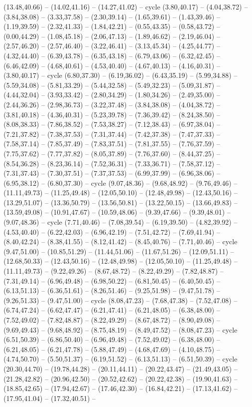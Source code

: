 {(13.48,40.66) -- (14.02,41.16) -- (14.27,41.02) -- cycle (3.80,40.17) -- (4.04,38.72) -- (3.84,38.08) -- (3.33,37.58) -- (2.30,39.14) -- (1.65,39.61) -- (1.43,39.46) -- (1.19,39.59) -- (2.32,41.33) -- (1.84,42.21) -- (0.55,43.35) -- (0.58,43.72) -- (0.00,44.29) -- (1.08,45.18) -- (2.06,47.13) -- (1.89,46.62) -- (2.19,46.04) -- (2.57,46.20) -- (2.57,46.40) -- (3.22,46.41) -- (3.13,45.34) -- (4.25,44.77) -- (4.32,44.40) -- (6.39,43.78) -- (6.35,43.18) -- (6.79,43.06) -- (6.32,42.45) -- (6.46,42.09) -- (4.68,40.61) -- (4.53,40.40) -- (4.67,40.13) -- (4.16,40.31) -- (3.80,40.17) -- cycle (6.80,37.30) -- (6.19,36.02) -- (6.43,35.19) -- (5.99,34.88) -- (5.59,34.08) -- (5.81,33.29) -- (5.44,32.58) -- (5.49,32.23) -- (5.09,31.87) -- (4.44,32.04) -- (3.93,33.42) -- (2.80,34.29) -- (1.80,34.26) -- (2.49,35.00) -- (2.44,36.26) -- (2.98,36.73) -- (3.22,37.48) -- (3.84,38.08) -- (4.04,38.72) -- (3.81,40.18) -- (4.36,40.31) -- (5.23,39.78) -- (7.36,39.42) -- (8.24,38.50) -- (8.08,38.33) -- (7.86,38.52) -- (7.53,38.27) -- (7.12,38.43) -- (6.97,38.04) -- (7.21,37.82) -- (7.38,37.53) -- (7.31,37.44) -- (7.42,37.38) -- (7.47,37.33) -- (7.58,37.14) -- (7.85,37.49) -- (7.83,37.51) -- (7.81,37.55) -- (7.76,37.59) -- (7.75,37.62) -- (7.77,37.82) -- (8.05,37.89) -- (7.76,37.60) -- (8.44,37.25) -- (8.54,36.28) -- (8.23,36.14) -- (7.52,36.31) -- (7.33,36.71) -- (7.58,37.12) -- (7.31,37.43) -- (7.30,37.51) -- (7.37,37.53) -- (6.99,37.99) -- (6.96,38.06) -- (6.95,38.12) -- (6.80,37.30) -- cycle (9.07,48.36) -- (9.68,48.92) -- (9.76,49.46) -- (11.11,49.73) -- (11.25,49.48) -- (12.05,50.10) -- (12.48,49.98) -- (12.43,50.16) -- (13.29,51.07) -- (13.36,50.79) -- (13.56,50.81) -- (13.22,50.15) -- (13.66,49.83) -- (13.59,49.08) -- (10.91,47.67) -- (10.59,48.06) -- (9.39,47.66) -- (9.39,48.01) -- (9.07,48.36) -- cycle (7.71,40.46) -- (7.08,39.54) -- (6.19,39.50) -- (4.82,39.92) -- (4.53,40.40) -- (6.22,42.03) -- (6.96,42.19) -- (7.51,42.72) -- (7.69,41.94) -- (8.40,42.24) -- (8.38,41.55) -- (8.12,41.42) -- (8.45,40.76) -- (7.71,40.46) -- cycle (9.47,51.00) -- (10.85,51.29) -- (11.44,51.06) -- (11.67,51.26) -- (12.09,51.11) -- (12.68,50.33) -- (12.43,50.16) -- (12.48,49.98) -- (12.05,50.10) -- (11.25,49.48) -- (11.11,49.73) -- (9.22,49.26) -- (8.67,48.72) -- (8.22,49.29) -- (7.82,48.87) -- (7.31,49.14) -- (6.96,49.48) -- (6.98,50.22) -- (6.81,50.45) -- (6.40,50.45) -- (6.13,51.13) -- (6.36,51.61) -- (8.26,51.46) -- (9.25,51.98) -- (9.47,51.78) -- (9.26,51.33) -- (9.47,51.00) -- cycle (8.08,47.23) -- (7.68,47.38) -- (7.52,47.08) -- (6.74,47.24) -- (6.62,47.47) -- (6.21,47.41) -- (6.21,48.05) -- (6.38,48.00) -- (7.52,49.02) -- (7.82,48.87) -- (8.22,49.29) -- (8.67,48.72) -- (8.90,49.08) -- (9.69,49.43) -- (9.68,48.92) -- (8.75,48.19) -- (8.49,47.52) -- (8.08,47.23) -- cycle (6.51,50.39) -- (6.86,50.40) -- (6.96,49.48) -- (7.52,49.02) -- (6.38,48.00) -- (6.21,48.05) -- (6.21,47.78) -- (5.88,47.49) -- (4.68,47.69) -- (4.10,48.75) -- (4.74,50.70) -- (5.50,51.37) -- (6.19,51.52) -- (6.13,51.13) -- (6.51,50.39) -- cycle (20.30,44.70) -- (19.78,44.28) -- (20.11,44.11) -- (20.22,43.47) -- (21.49,43.05) -- (21.28,42.82) -- (20.96,42.50) -- (20.52,42.62) -- (20.22,42.38) -- (19.90,41.63) -- (18.85,42.65) -- (17.94,42.67) -- (17.46,42.30) -- (16.84,42.21) -- (17.13,41.62) -- (17.95,41.04) -- (17.32,40.51) -- }
